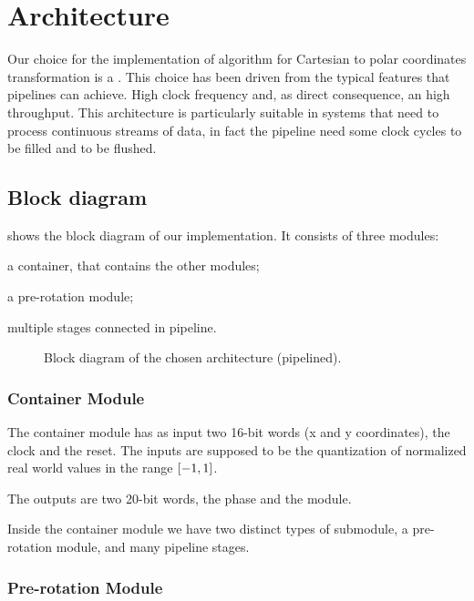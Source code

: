 \section{Architecture}\label{sec:arch}

Our choice for the implementation of \cordic{} algorithm for Cartesian to polar
coordinates transformation is a . This choice
has been driven from the typical features that pipelines can achieve. High clock
frequency and, as direct consequence, an high throughput. This architecture is
particularly suitable in systems that need to process continuous streams of
data, in fact the pipeline need some clock cycles to be filled and to be
flushed.

\subsection{Block diagram}

 shows the block diagram of our implementation. It
consists of three modules:
\begin{enumerate*}[label=]
	\item a container, that contains the other modules;
	\item a pre-rotation module;
	\item multiple stages connected in pipeline.
\end{enumerate*}

\begin{figure}[hb]
	\caption{Block diagram of the chosen architecture (pipelined).}\label{fig:blockdiagram}
\end{figure}

\subsubsection{Container Module}

The container module has as input two 16-bit words (x and y coordinates), the
clock and the reset. The inputs are supposed to be the quantization of
normalized real world values in the range \(\interval{-1}{1}\).

The outputs are two 20-bit words, the phase and the module.

Inside the container module we have two distinct types of submodule, a
pre-rotation module, and many pipeline stages.

\subsubsection{Pre-rotation Module}

